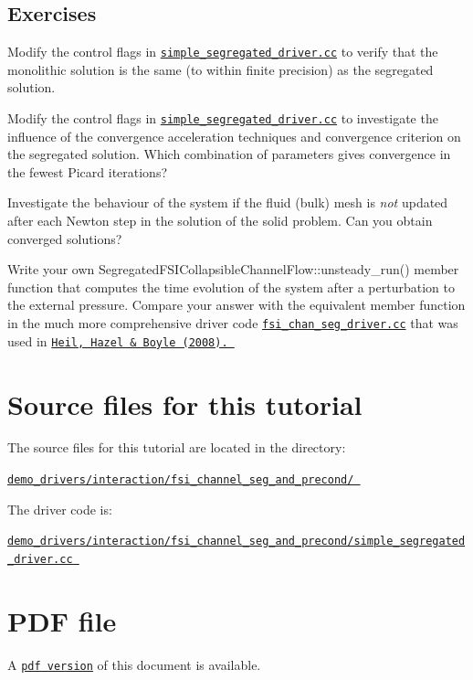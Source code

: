 \hypertarget{index_ex}{}\subsection{Exercises}\label{index_ex}

\begin{DoxyEnumerate}
\item Modify the control flags in {\ttfamily \href{../../../../demo_drivers/interaction/fsi_channel_seg_and_precond/simple_segregated_driver.cc}{\tt simple\+\_\+segregated\+\_\+driver.\+cc}} to verify that the monolithic solution is the same (to within finite precision) as the segregated solution.
\item Modify the control flags in {\ttfamily \href{../../../../demo_drivers/interaction/fsi_channel_seg_and_precond/simple_segregated_driver.cc}{\tt simple\+\_\+segregated\+\_\+driver.\+cc}} to investigate the influence of the convergence acceleration techniques and convergence criterion on the segregated solution. Which combination of parameters gives convergence in the fewest Picard iterations?
\item Investigate the behaviour of the system if the fluid (bulk) mesh is {\itshape not} updated after each Newton step in the solution of the solid problem. Can you obtain converged solutions?
\item Write your own {\ttfamily Segregated\+F\+S\+I\+Collapsible\+Channel\+Flow\+::unsteady\+\_\+run()} member function that computes the time evolution of the system after a perturbation to the external pressure. Compare your answer with the equivalent member function in the much more comprehensive driver code {\ttfamily \href{../../../../demo_drivers/interaction/fsi_channel_seg_and_precond/fsi_chan_seg_driver.cc}{\tt fsi\+\_\+chan\+\_\+seg\+\_\+driver.\+cc}} that was used in \href{http://www.springerlink.com/content/m3r6318701g338g4/}{\tt Heil, Hazel \& Boyle (2008). }
\end{DoxyEnumerate}

 

\hypertarget{index_sources}{}\section{Source files for this tutorial}\label{index_sources}

\begin{DoxyItemize}
\item The source files for this tutorial are located in the directory\+: \begin{center} \href{../../../../demo_drivers/interaction/fsi_channel_seg_and_precond/}{\tt demo\+\_\+drivers/interaction/fsi\+\_\+channel\+\_\+seg\+\_\+and\+\_\+precond/ } \end{center} 
\item The driver code is\+: \begin{center} \href{../../../../demo_drivers/interaction/fsi_channel_seg_and_precond/simple_segregated_driver.cc}{\tt demo\+\_\+drivers/interaction/fsi\+\_\+channel\+\_\+seg\+\_\+and\+\_\+precond/simple\+\_\+segregated\+\_\+driver.\+cc } \end{center} 
\end{DoxyItemize}

 

 \hypertarget{index_pdf}{}\section{P\+D\+F file}\label{index_pdf}
A \href{../latex/refman.pdf}{\tt pdf version} of this document is available. 
